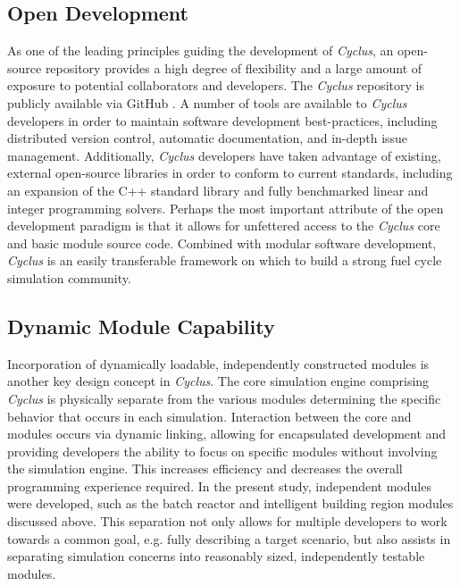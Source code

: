 \documentclass{anstrans}
\begin{document}
\subsection{Open Development}
As one of the leading principles guiding the development of \emph{Cyclus}, an open-source repository provides a high degree of flexibility 
and a large amount of exposure to potential collaborators and developers. The \emph{Cyclus} repository is publicly available via 
GitHub \cite{cyclus2012}. A number of tools are available to \emph{Cyclus} developers in order to maintain software development best-practices, 
including distributed version control, automatic documentation, and in-depth issue management. Additionally, \emph{Cyclus} developers have taken 
advantage of existing, external open-source libraries in order to conform to current standards, including an expansion of the C++ standard
library and fully benchmarked linear and integer programming solvers. Perhaps the most important attribute of the open development paradigm 
is that it allows for unfettered access to the \emph{Cyclus} core and basic module source code. Combined with modular software development, \emph{Cyclus} 
is an easily transferable framework on which to build a strong fuel cycle simulation community.
\subsection{Dynamic Module Capability}
Incorporation of dynamically loadable, independently constructed modules is another key design concept in \emph{Cyclus}. The core simulation engine 
comprising \emph{Cyclus} is physically separate from the various modules determining the specific behavior that occurs in each simulation. 
Interaction between the core and modules occurs via dynamic linking, allowing for encapsulated development and providing developers the ability 
to focus on specific modules without involving the simulation engine. This increases efficiency and decreases the overall programming experience 
required. In the present study, independent modules were developed, such as the batch reactor and intelligent building region modules discussed 
above. This separation not only allows for multiple developers to work towards a common goal, e.g. fully describing a target scenario, but
also assists in separating simulation concerns into reasonably sized, independently testable modules.
\end{document}
